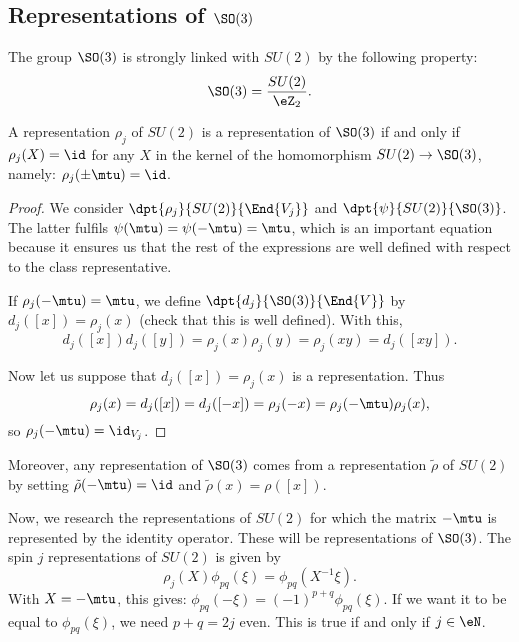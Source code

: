\subsection{Representations of \texorpdfstring{$\SO(3)$}{SO3}}\label{pg:reprez_SOt}

The group $\SO(3)$ is strongly linked with $SU(2)$ by the following property:
\begin{equation}		\label{EqSOSUeZ}
   \SO(3)=\frac{SU(2)}{\eZ_2}.
\end{equation}

\begin{lemma}
A representation $\rho_j$ of $SU(2)$ is a representation of $\SO(3)$ if and only if $\rho_j(X)=\id$ for any $X$ in the kernel of the homomorphism $SU(2)\to \SO(3)$, namely: $\rho_j(\pm\mtu)=\id$.
\label{lem:SO_3}
\end{lemma}

\begin{proof}
We consider $\dpt{\rho_j}{SU(2)}{\End{V_j}}$ and $\dpt{\psi}{SU(2)}{\SO(3)}$. The latter fulfils $\psi(\mtu)=\psi(-\mtu)=\mtu$, which is an important equation because it ensures us that the rest of the expressions are well defined with respect to the class representative.

If $\rho_j(-\mtu)=\mtu$, we define $\dpt{d_j}{\SO(3)}{\End{V}}$ by $d_j([x])=\rho_j(x)$ (check that this is well defined). With this, 
\[
  d_j([x])d_j([y])=\rho_j(x)\rho_j(y)=\rho_j(xy)=d_j([xy]).
\]

Now let us suppose that $d_j([x])=\rho_j(x)$ is a representation. Thus 
\[
  \rho_j(x)=d_j([x])=d_j([-x])=\rho_j(-x)=\rho_j(-\mtu)\rho_j(x),
\]
so $\rho_j(-\mtu)=\id_{V_j}$.

\end{proof}

Moreover, any representation of $\SO(3)$ comes from a representation $\tilde\rho$ of $SU(2)$ by setting $\tilde\rho(-\mtu)=\id$ and $\tilde\rho(x)=\rho([x])$.

Now, we research the representations of $SU(2)$ for which the matrix $-\mtu$ is represented by the identity operator. These will be representations of $\SO(3)$. The spin $j$ representations of $SU(2)$ is given by
\[
   \rho_j(X)\phi_{pq}(\xi)=\phi_{pq}(X^{-1}\xi).
\]
With $X=-\mtu$, this gives: $\phi_{pq}(-\xi)=(-1)^{p+q}\phi_{pq}(\xi)$. If we want it to be equal to $\phi_{pq}(\xi)$, we need $p+q=2j$ even. This is true if and only if $j\in\eN$.

